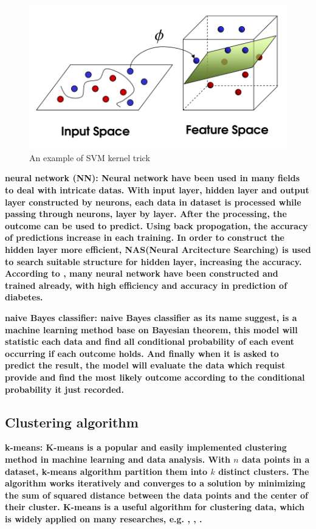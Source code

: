 \documentclass[twocolumn,10pt]{article}
\begin{document}
\begin{figure}[htb]
    \centering
    \includegraphics[scale=0.25]{assets/SVM_kernel_trick.png}
    \caption{An example of SVM kernel trick}
    \label{fig:SVM_kernel_trick}
\end{figure}

\bf{neural network (NN)}: \rm{Neural} network have been used in many fields to deal with intricate datas. 
With input layer, hidden layer and output layer constructed by neurons, each data in dataset is processed 
while passing through neurons, layer by layer. After the processing, the outcome can be used to predict. 
Using back propogation, the accuracy of predictions increase in each training. In order to construct the 
hidden layer more efficient, NAS(Neural Arcitecture Searching) is used to search suitable structure for 
hidden layer, increasing the accuracy. According to \cite{Gadekallu2020}\cite{Beghriche2021}, many neural 
network have been constructed and trained already, with high efficiency and accuracy in prediction of 
diabetes.

\bf{naive Bayes classifier}: \rm{naive Bayes classifier} as its name suggest, is a machine learning method base on Bayesian 
theorem, this model will statistic each data and find all conditional probability of each event occurring if each outcome holds. 
And finally when it is asked to predict the result, the model will evaluate the data which requist provide and find the most 
likely outcome according to the conditional probability it just recorded. 

\subsection*{Clustering algorithm}

\bf{k-means}: \rm{K-means} is a popular and easily implemented clustering method in machine learning and 
data analysis. With $n$ data points in a dataset, k-means algorithm partition them into $k$ distinct 
clusters. The algorithm works iteratively and converges to a solution by minimizing the sum of squared 
distance between the data points and the center of their cluster. K-means is a useful algorithm for 
clustering data, which is widely applied on many researches, e.g. \cite{oyelade2010application}, 
\cite{NIDHEESH2017213}, \cite{kadhm2018accurate}.
\end{document}
